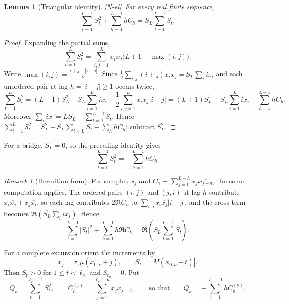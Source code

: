 \documentclass[11pt,reqno]{amsart}
\numberwithin{equation}{section}
\theoremstyle{plain}
\newtheorem{lemma}[theorem]{Lemma}
\theoremstyle{definition}
\theoremstyle{remark}
\newtheorem{remark}[theorem]{Remark}
\newcommand{\tagNE}{\textup{[N-el]}}
\begin{document}
\begin{lemma}[Triangular identity]
\label{lem:triangular-corr}
\tagNE\ For every real finite sequence,
\begin{equation}
\label{eq:general-triangular}
\sum_{t=1}^{L-1}S_t^2+\sum_{h=1}^{L-1}hC_h
=S_L\sum_{t=1}^{L-1}S_t.
\end{equation}
\end{lemma}

\begin{proof}
Expanding the partial sums,
\begin{equation}
\sum_{t=1}^{L}S_t^2
=\sum_{i,j=1}^{L}x_ix_j\bigl(L+1-\max(i,j)\bigr).
\end{equation}
Write $\max(i,j)=\frac{i+j+|i-j|}{2}$. Since
$\frac12\sum_{i,j}(i+j)x_ix_j=S_L\sum_i ix_i$ and each unordered pair at
lag $h=|i-j|\ge1$ occurs twice,
\begin{equation}
\sum_{t=1}^{L}S_t^2=(L+1)S_L^2-S_L\sum_{i=1}^{L}ix_i
-\frac12\sum_{i,j=1}^{L}x_ix_j|i-j|
=(L+1)S_L^2-S_L\sum_{i=1}^{L}ix_i-\sum_{h=1}^{L-1}hC_h .
\end{equation}
Moreover $\sum_i ix_i=LS_L-\sum_{t=1}^{L-1}S_t$.
Hence
$\sum_{t=1}^{L}S_t^2=S_L^2+S_L\sum_{t<L}S_t-\sum_hhC_h$; subtract $S_L^2$.
\end{proof}

For a bridge, $S_L=0$, so the preceding identity gives
\begin{equation}
\label{eq:bridge-triangular}
\sum_{t=1}^{L-1}S_t^2=-\sum_{h=1}^{L-1}hC_h.
\end{equation}

\begin{remark}[Hermitian form]
\label{rem:hermitian}
For complex $x_j$ and $C_h=\sum_{j=1}^{L-h}x_j\overline{x_{j+h}}$, the same
computation applies. The ordered pairs $(i,j)$ and $(j,i)$ at lag $h$
contribute $x_i\overline{x_j}+x_j\overline{x_i}$, so each lag contributes
$2\Re C_h$ to $\sum_{i,j}x_i\overline{x_j}|i-j|$, and the cross term
becomes $\Re(\overline{S_L}\sum_i ix_i)$. Hence
\begin{equation}
\sum_{t=1}^{L-1}|S_t|^2+\sum_{h=1}^{L-1}h\Re C_h
=\Re\!\left(\overline{S_L}\sum_{t=1}^{L-1}S_t\right).
\end{equation}
\end{remark}

For a complete excursion orient the increments by
\begin{equation}
\label{eq:orientation}
x_j=\sigma_\nu\mu(x_{0,\nu}+j),\qquad
S_t=|M(x_{0,\nu}+t)|.
\end{equation}
Then $S_t>0$ for $1\le t<\ell_\nu$ and $S_{\ell_\nu}=0$. Put
\begin{equation}
\label{eq:Q_def}
Q_\nu=\sum_{t=1}^{\ell_\nu-1}S_t^2,\qquad
C_h^{(\nu)}=\sum_{j=1}^{\ell_\nu-h}x_jx_{j+h},
\qquad\text{so that}\qquad
Q_\nu=-\sum_{h=1}^{\ell_\nu-1}hC_h^{(\nu)}.
\end{equation}
\end{document}
